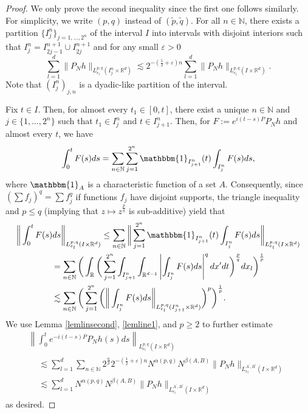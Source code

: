 \documentclass[10pt,leqno]{amsart}
\newcommand{\R}{\mathbb{R}} %
\numberwithin{equation}{section}
\newcommand{\N}{\mathbb{N}}
\begin{document}
\begin{proof}
We only prove the second inequality  since the first one follows similarly.
For simplicity, we write $(p, q)$ instead of $(\tilde{p}, \tilde{q})$. 
For all $n\in \N$, there exists a partition $\{I_j^n\}_{j=1,\ldots ,2^n}$ of the interval $I$ into intervals
with disjoint interiors such that $I_j^n = I_{2j - 1}^{n + 1} \cup I_{2j}^{n+1}$ and for any small $\varepsilon > 0$
\begin{equation}
\label{lemline1}
\sum_{l=1}^d \|P_N h\|_{L_{e_l}^{p,q} (I_j^n \times \R^d)} \lesssim 2^{-(\frac{1}{2} + \varepsilon) n}\sum_{l=1}^d \|P_N h\|_{L_{e_l}^{p,q} (I \times \R^d) }.
\end{equation}
Note that $(I^n_j)_{j, n}$ is a dyadic-like partition of the interval. 

Fix $t \in I$. Then, for almost every $t_1 \in [0, t]$, there exist a unique $n\in \N$ and $j\in \{1,\ldots ,2^n\}$ such that $t_1\in I_j^n$ and $t \in I_{j+1}^n$.
Then, for $F := e^{i(t-s)P}P_N h$ and almost every $t$, we have
$$\int_0^t F(s) ds = \sum_{n\in \N} \sum_{j=1}^{2^n} \mathbbm{1}_{I^n_{j+1}}(t) \int_{I_j^n} F(s) ds, $$
where $\mathbbm{1}_{A}$ is a characteristic function of a set $A$. Consequently, since $(\sum f_j)^q = \sum f_j^q$ if 
functions $f_j$ have disjoint supports,  the triangle inequality and  $p \leq q$ (implying that $z \mapsto z^{\frac{p}{q}}$ is sub-additive) yield that  
\begin{multline*}
\bigg \|\int_0^t F(s) ds \bigg\|_{L_{e_l}^{p,q}(I \times \R^d)} \leq \sum_{n\in \N} \bigg \| \sum_{j=1}^{2^n} \mathbbm{1}_{I^n_{j+1}}(t) \int_{I^n_j} F(s) ds \bigg\|_{L_{e_l}^{p,q}(I \times \R^d)} \\
\begin{aligned}
&= \sum_{n\in \N}\bigg(\int_{\R} \bigg(\sum_{j=1}^{2^n} \int_{I_{j+1}^n} \int_{\R^{d-1}} \left|\int_{I^n_j } F(s) ds \right|^q dx^\prime dt\bigg)^{\frac{p}{q}}  dx_l \bigg)^{\frac{1}{p}}\\
&\lesssim \sum_{n\in \N} \bigg(\sum_{j=1}^{2^n} \bigg(\bigg\|\int_{I_j^n} F(s) ds \bigg\|_{L_{e_l}^{p,q} (I_{j+1}^n \times \R^d)} \bigg)^p \bigg)^{\frac{1}{p}}.
\end{aligned}
\end{multline*}
We use Lemma \ref{lemlinsecond}, \eqref{lemline1}, and $p \geq 2$  to further estimate 
\begin{multline*}
\left\|\int_0^t e^{-i(t-s) P} P_N h(s) ds \right\|_{L_{e_l}^{p,q}(I \times \R^d)}\\
\begin{aligned}
&\lesssim  \sum_{l = 1}^d \sum_{n\in \N} 2^{\frac{n}{p}} 2^{-(\frac{1}{2} + \varepsilon ) n}  N^{\alpha (p,q)} N^{\beta (A,B)} \|P_N h\|_{L_{e_l}^{A^\prime ,B^\prime}(I\times \R^d )}  \\
&\lesssim  \sum_{l = 1}^d N^{\alpha (p ,q)}  N^{\beta (A,B)} \|P_N h\|_{L_{e_l}^{A^\prime ,B^\prime} (I\times \R^d )}
\end{aligned} 
\end{multline*}
as desired.
\end{proof}
\end{document}
